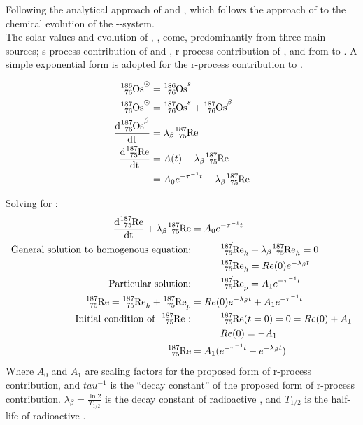 
\renewcommand{\d}[1]{\frac{\textrm{d}#1}{\textrm{dt}}}
\newcommand{\pd}[2]{\frac{\partial #1}{\partial #2}}

Following the analytical approach of  and , which follows the approach of  to the chemical evolution of the --system. \\
The solar values and evolution of , ,  come, predominantly from three main sources;
s-process contribution of  and , r-process contribution of ,
and \betadecay from  to .
A simple exponential form is adopted for the r-process contribution to .

\begin{align*}
  \os{186}^\odot &= \os{186}^s \\
  \os{187}^\odot &= \os{187}^s + \os{187}^\beta \\
  \d{\os{187}^\beta} &= \lambda_\beta\re{187} \\
  \d{\re{187}} &= A(t) - \lambda_\beta\re{187} \\
  &= A_0e^{-\tau^{-1}t} - \lambda_\beta\re{187} \\
\end{align*}

\underline{Solving for :}
\begin{align*}
  \d{\re{187}} + \lambda_\beta \re{187} &= A_0e^{-\tau^{-1}t} \\
  \textrm{General solution to homogenous equation:}
  & \hspace{3em} \dot{\re{187}}_h + \lambda_\beta \re{187}_h = 0 \\
  & \hspace{3em} \re{187}_h = Re(0) e^{-\lambda_\beta t} \\
  \textrm{Particular solution:}
  & \hspace{3em} \dot{\re{187}}_p = A_1 e^{-\tau^{-1}t} \\
  \re{187} = \re{187}_h + \re{187}_p &= Re(0) e^{-\lambda_\beta t} + A_1 e^{-\tau^{-1}t} \\
  \textrm{Initial condition of \re{187}:}
  & \hspace{3em} \re{187}(t=0) = 0 = Re(0) + A_1 \\
  & \hspace{3em} Re(0) = - A_1 \\
  \re{187} &= A_1 (e^{-\tau^{-1}t} - e^{-\lambda_\beta t}) \\
\end{align*}
Where $A_0$ and $A_1$ are scaling factors for the proposed form of r-process contribution, and $tau^{-1}$ is the
``decay constant'' of the proposed form of r-process contribution.
$\lambda_\beta=\frac{\ln 2}{T_{1/2}}$ is the decay constant of radioactive , and $T_{1/2}$ is the half-life of radioactive .

